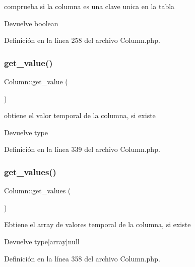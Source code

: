 comprueba si la columna es una clave unica en la tabla

\begin{DoxyReturn}{Devuelve}
boolean 
\end{DoxyReturn}


Definición en la línea 258 del archivo Column.\+php.

\mbox{\label{class_column_a16ae34425bea11e5f6435f2a8987a798}} 
\subsubsection{\texorpdfstring{get\_value()}{get\_value()}}
{\footnotesize\ttfamily Column\+::get\+\_\+value (\begin{DoxyParamCaption}{ }\end{DoxyParamCaption})}

obtiene el valor temporal de la columna, si existe

\begin{DoxyReturn}{Devuelve}
type 
\end{DoxyReturn}


Definición en la línea 339 del archivo Column.\+php.

\mbox{\label{class_column_a58db8b06f4c93ec071a51a1f76009052}} 
\subsubsection{\texorpdfstring{get\_values()}{get\_values()}}
{\footnotesize\ttfamily Column\+::get\+\_\+values (\begin{DoxyParamCaption}{ }\end{DoxyParamCaption})}

Ebtiene el array de valores temporal de la columna, si existe

\begin{DoxyReturn}{Devuelve}
type$\vert$array$\vert$null 
\end{DoxyReturn}


Definición en la línea 358 del archivo Column.\+php.

\mbox{\label{class_column_a58959194643294bb27c06cf13584f79a}} 
